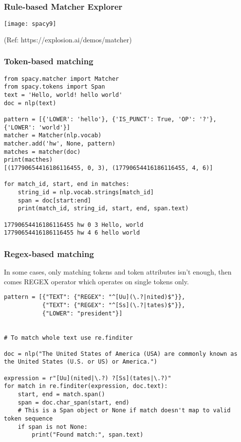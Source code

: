\begin{frame}[fragile]\frametitle{Rule-based Matcher Explorer}

\begin{center}
\texttt{[image: spacy9]}
\end{center}

{\tiny (Ref: https://explosion.ai/demos/matcher)}
\end{frame}


\begin{frame}[fragile]\frametitle{Token-based matching }

\begin{lstlisting}
from spacy.matcher import Matcher
from spacy.tokens import Span
text = 'Hello, world! hello world'
doc = nlp(text)

pattern = [{'LOWER': 'hello'}, {'IS_PUNCT': True, 'OP': '?'}, {'LOWER': 'world'}]
matcher = Matcher(nlp.vocab)
matcher.add('hw', None, pattern)
matches = matcher(doc)
print(macthes)
[(17790654416186116455, 0, 3), (17790654416186116455, 4, 6)]

for match_id, start, end in matches:
    string_id = nlp.vocab.strings[match_id]
    span = doc[start:end]
    print(match_id, string_id, start, end, span.text)
		
17790654416186116455 hw 0 3 Hello, world
17790654416186116455 hw 4 6 hello world		
\end{lstlisting}
	
\end{frame}

\begin{frame}[fragile]\frametitle{Regex-based matching }

In some cases, only matching tokens and token attributes isn't enough, then comes REGEX operator which  operates on single tokens only. 

\begin{lstlisting}
pattern = [{"TEXT": {"REGEX": "^[Uu](\.?|nited)$"}},
           {"TEXT": {"REGEX": "^[Ss](\.?|tates)$"}},
           {"LOWER": "president"}]

	
# To match whole text use re.finditer
	
doc = nlp("The United States of America (USA) are commonly known as the United States (U.S. or US) or America.")

expression = r"[Uu](nited|\.?) ?[Ss](tates|\.?)"
for match in re.finditer(expression, doc.text):
    start, end = match.span()
    span = doc.char_span(start, end)
    # This is a Span object or None if match doesn't map to valid token sequence
    if span is not None:
        print("Found match:", span.text)
\end{lstlisting}

\end{frame}

